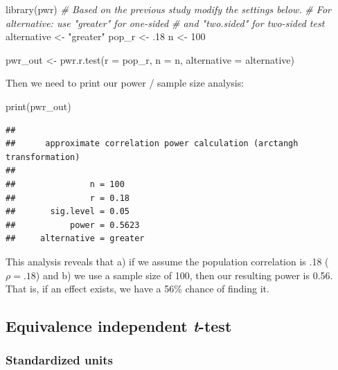 \documentclass[
]{krantz}
\makeatletter
\newenvironment{Shaded}{\begin{snugshade}}{\end{snugshade}}
\newcommand{\AttributeTok}[1]{\textcolor[rgb]{0.61,0.61,0.61}{#1}}
\newcommand{\CommentTok}[1]{\textcolor[rgb]{0.37,0.37,0.37}{\textit{#1}}}
\newcommand{\DecValTok}[1]{\textcolor[rgb]{0.06,0.06,0.06}{#1}}
\newcommand{\FunctionTok}[1]{\textcolor[rgb]{0,0,0}{#1}}
\newcommand{\NormalTok}[1]{#1}
\newcommand{\OtherTok}[1]{\textcolor[rgb]{0.37,0.37,0.37}{#1}}
\newcommand{\StringTok}[1]{\textcolor[rgb]{0.5,0.5,0.5}{#1}}
\newenvironment{kframe}{%
\medskip{}
\setlength{\fboxsep}{.8em}
 \def\at@end@of@kframe{}%
 \ifinner\ifhmode%
  \def\at@end@of@kframe{\end{minipage}}%
  \begin{minipage}{\columnwidth}%
 \fi\fi%
 \def\FrameCommand##1{\hskip\@totalleftmargin \hskip-\fboxsep
 \colorbox{shadecolor}{##1}\hskip-\fboxsep
     \hskip-\linewidth \hskip-\@totalleftmargin \hskip\columnwidth}%
 \MakeFramed {\advance\hsize-\width
   \@totalleftmargin\z@ \linewidth\hsize
   \@setminipage}}%
 {\par\unskip\endMakeFramed%
 \at@end@of@kframe}
\renewenvironment{Shaded}{\begin{kframe}}{\end{kframe}}
\makeatother
\begin{document}
\begin{Shaded}
\begin{Highlighting}[]
\FunctionTok{library}\NormalTok{(pwr)}
\CommentTok{\# Based on the previous study modify the settings below.}
\CommentTok{\# For alternative: use "greater" for one{-}sided }
\CommentTok{\# and "two.sided" for two{-}sided test}
\NormalTok{alternative }\OtherTok{\textless{}{-}} \StringTok{"greater"}
\NormalTok{pop\_r }\OtherTok{\textless{}{-}}\NormalTok{ .}\DecValTok{18}
\NormalTok{n }\OtherTok{\textless{}{-}} \DecValTok{100}

\NormalTok{pwr\_out }\OtherTok{\textless{}{-}} \FunctionTok{pwr.r.test}\NormalTok{(}\AttributeTok{r =}\NormalTok{ pop\_r, }
                      \AttributeTok{n =}\NormalTok{ n,}
                      \AttributeTok{alternative =}\NormalTok{ alternative)}
\end{Highlighting}
\end{Shaded}

Then we need to print our power / sample size analysis:

\begin{Shaded}
\begin{Highlighting}[]
\FunctionTok{print}\NormalTok{(pwr\_out)}
\end{Highlighting}
\end{Shaded}

\begin{verbatim}
## 
##      approximate correlation power calculation (arctangh transformation) 
## 
##               n = 100
##               r = 0.18
##       sig.level = 0.05
##           power = 0.5623
##     alternative = greater
\end{verbatim}

This analysis reveals that a) if we assume the population correlation is .18 (\(\rho = .18\)) and b) we use a sample size of 100, then our resulting power is 0.56. That is, if an effect exists, we have a 56\% chance of finding it.

\hypertarget{equivalence-independent-t-test}{%
\subsection{\texorpdfstring{Equivalence independent \emph{t}-test}{Equivalence independent t-test}}\label{equivalence-independent-t-test}}

\hypertarget{standardized-units-5}{%
\subsubsection{Standardized units}\label{standardized-units-5}}
\end{document}
